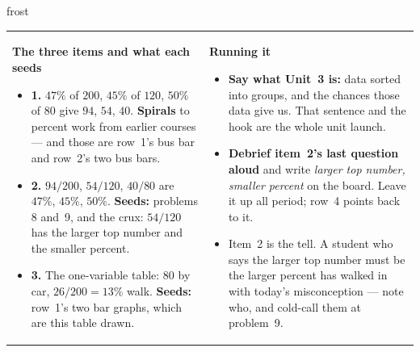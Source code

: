 \documentclass[10pt]{article}
\begin{document}
\begin{fixedskillbox}{frost}
\begin{tabularx}{\linewidth}{@{}X X@{}}
\begin{minipage}[t]{\linewidth}\vspace{0pt}
    \textbf{The three items and what each seeds}
    \begin{itemize}[leftmargin=1.1em, itemsep=1pt, topsep=2pt]
      \item \textbf{1.} $47\%$ of $200$, $45\%$ of $120$, $50\%$ of $80$ give $94$, $54$, $40$.
            \textbf{Spirals} to percent work from earlier courses --- and those are row~1's bus
            bar and row~2's two bus bars.
      \item \textbf{2.} $94/200$, $54/120$, $40/80$ are $47\%$, $45\%$, $50\%$. \textbf{Seeds:}
            problems 8 and~9, and the crux: $54/120$ has the larger top number and the smaller
            percent.
      \item \textbf{3.} The one-variable table: $80$ by car, $26/200 = 13\%$ walk.
            \textbf{Seeds:} row~1's two bar graphs, which are this table drawn.
    \end{itemize}
\end{minipage}
&
\begin{minipage}[t]{\linewidth}\vspace{0pt}
    \textbf{Running it}
    \begin{itemize}[leftmargin=1.1em, itemsep=1pt, topsep=2pt]
      \item \textbf{Say what Unit~3 is:} data sorted into groups, and the chances those data
            give us. That sentence and the hook are the whole unit launch.
      \item \textbf{Debrief item~2's last question aloud} and write \emph{larger top number,
            smaller percent} on the board. Leave it up all period; row~4 points back to it.
      \item Item~2 is the tell. A student who says the larger top number must be the larger
            percent has walked in with today's misconception --- note who, and cold-call them
            at problem~9.
    \end{itemize}
\end{minipage}
\end{tabularx}
\end{fixedskillbox}
\end{document}
